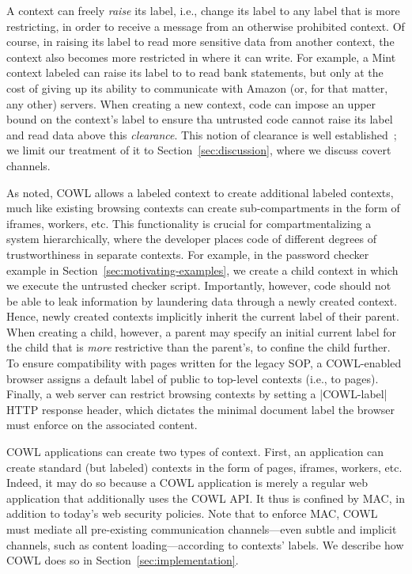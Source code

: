 A context can freely \emph{raise} its label, i.e., change its label to
any label that is more restricting, in order to receive a message
from an otherwise prohibited context.
%
Of course, in raising its label to read more sensitive data from
another context, the context also becomes more restricted in where it
can write.
%
For example, a Mint context labeled
 can raise its label to
 to read bank statements, but
only at the cost of giving up its ability to communicate with Amazon
(or, for that matter, any other) servers.
%
When creating a new context, code can impose an upper bound on the
context's label to ensure tha untrusted code cannot raise its label
and read data above this \emph{clearance}.
%
This notion of clearance is well
established~\cite{efstathopoulos:asbestos, Zeldovich:2006,
  stefan:2011:flexible, Breeze13}; we limit our treatment of it to
Section~\ref{sec:discussion}, where we discuss covert channels.

As noted, COWL allows a labeled context to create additional labeled contexts,
much like existing browsing contexts can create sub-compartments
in the form of iframes, workers, etc.
%
This functionality is crucial for compartmentalizing a system
hierarchically, where the developer places code of different degrees
of trustworthiness in separate contexts.
%
For example, in the password checker example in
Section~\ref{sec:motivating-examples}, we create a child context in
which we execute the untrusted checker script.
%
Importantly, however, code should not be able to leak information by
laundering data through a newly created context.
%
Hence, newly created contexts implicitly inherit the current label of
their parent.
%
When creating a child, however, a parent may specify an initial
current label for the child that is {\em more} restrictive than the
parent's, to confine the child further.
%
To ensure compatibility with pages written for the legacy SOP, a
COWL-enabled browser assigns a default label of public to top-level
contexts (i.e., to pages).
%
Finally, a web server can restrict browsing contexts by setting a
\js|COWL-label| HTTP response header, which dictates the minimal
document label the browser must enforce on the associated content.

COWL applications can create two types of context.
%
First, an application can create standard (but labeled) contexts in
the form of pages, iframes, workers, etc.
%
Indeed, it may do so because a COWL application is merely a regular
web application that additionally uses the COWL API. It thus is
confined by MAC, in addition to today's web security policies.
%
Note that to enforce MAC, COWL must mediate all pre-existing
communication channels---even subtle and implicit channels, such as
content loading---according to contexts' labels.
%
We describe how COWL does so in Section~\ref{sec:implementation}.

